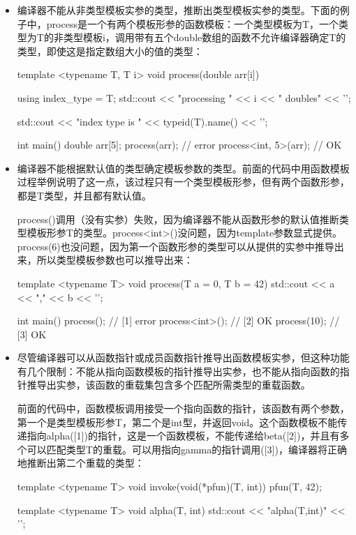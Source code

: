 \begin{itemize}
  \item 编译器不能从非类型模板实参的类型，推断出类型模板实参的类型。下面的例子中，process是一个有两个模板形参的函数模板：一个类型模板为T，一个类型为T的非类型模板i，调用带有五个double数组的函数不允许编译器确定T的类型，即使这是指定数组大小的值的类型：

\begin{cpp}
template <typename T, T i>
void process(double arr[i])
{
	using index_type = T;
	std::cout << "processing " << i
	          << " doubles" << '\n';
	          
	std::cout << "index type is "
              << typeid(T).name() << '\n';
}

int main()
{
	double arr[5]{};
	process(arr); // error
	process<int, 5>(arr); // OK
}
\end{cpp}
  \item 编译器不能根据默认值的类型确定模板参数的类型。前面的代码中用函数模板过程举例说明了这一点，该过程只有一个类型模板形参，但有两个函数形参，都是T类型，并且都有默认值。

process()调用（没有实参）失败，因为编译器不能从函数形参的默认值推断类型模板形参T的类型。process<int>()没问题，因为template参数显式提供。process(6)也没问题，因为第一个函数形参的类型可以从提供的实参中推导出来，所以类型模板参数也可以推导出来：

\begin{cpp}
template <typename T>
void process(T a = 0, T b = 42)
{
	std::cout << a << "," << b << '\n';
}

int main()
{
	process(); // [1] error
	process<int>(); // [2] OK
	process(10); // [3] OK
}
\end{cpp}
  \item 尽管编译器可以从函数指针或成员函数指针推导出函数模板实参，但这种功能有几个限制：不能从指向函数模板的指针推导出实参，也不能从指向函数的指针推导出实参，该函数的重载集包含多个匹配所需类型的重载函数。

前面的代码中，函数模板调用接受一个指向函数的指针，该函数有两个参数，第一个是类型模板形参T，第二个是int型，并返回void。这个函数模板不能传递指向alpha([1])的指针，这是一个函数模板，不能传递给beta([2])，并且有多个可以匹配类型T的重载。可以用指向gamma的指针调用([3])，编译器将正确地推断出第二个重载的类型：

\begin{cpp}
template <typename T>
void invoke(void(*pfun)(T, int))
{
	pfun(T{}, 42);
}

template <typename T>
void alpha(T, int)
{ std::cout << "alpha(T,int)" << '\n'; }


\end{cpp}
\end{itemize}
